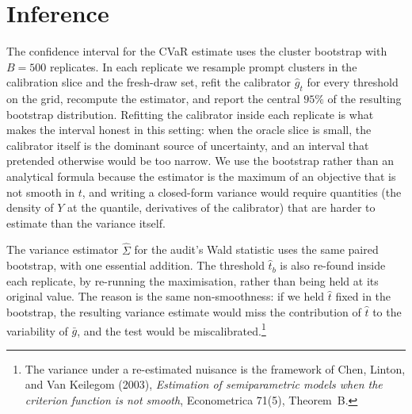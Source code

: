 \documentclass[11pt]{article}
\begin{document}
\section{Inference}

The confidence interval for the CVaR estimate uses the cluster bootstrap with $B = 500$ replicates. In each replicate we resample prompt clusters in the calibration slice and the fresh-draw set, refit the calibrator $\hat g_t$ for every threshold on the grid, recompute the estimator, and report the central $95\%$ of the resulting bootstrap distribution. Refitting the calibrator inside each replicate is what makes the interval honest in this setting: when the oracle slice is small, the calibrator itself is the dominant source of uncertainty, and an interval that pretended otherwise would be too narrow. We use the bootstrap rather than an analytical formula because the estimator is the maximum of an objective that is not smooth in $t$, and writing a closed-form variance would require quantities (the density of $Y$ at the quantile, derivatives of the calibrator) that are harder to estimate than the variance itself.

The variance estimator $\hat\Sigma$ for the audit's Wald statistic uses the same paired bootstrap, with one essential addition. The threshold $\hat t_b$ is also re-found inside each replicate, by re-running the maximisation, rather than being held at its original value. The reason is the same non-smoothness: if we held $\hat t$ fixed in the bootstrap, the resulting variance estimate would miss the contribution of $\hat t$ to the variability of $\bar g$, and the test would be miscalibrated.\footnote{The variance under a re-estimated nuisance is the framework of Chen, Linton, and Van Keilegom (2003), \emph{Estimation of semiparametric models when the criterion function is not smooth}, Econometrica 71(5), Theorem~B.}
\end{document}

